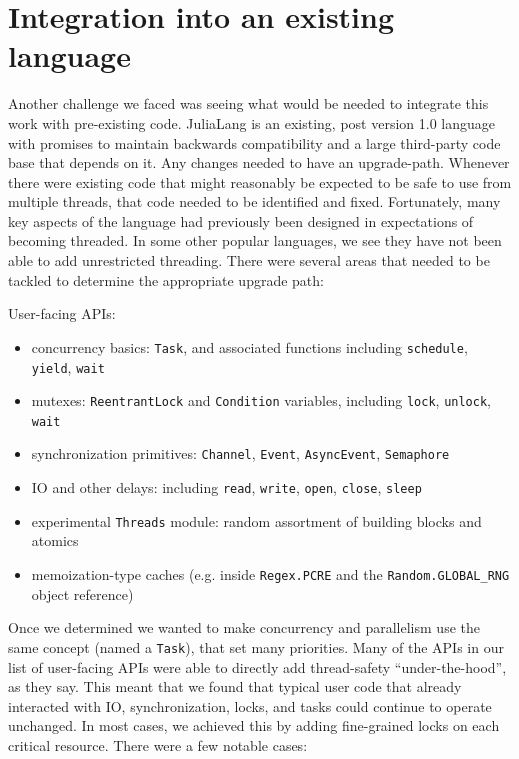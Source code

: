 \documentclass{juliacon}
\begin{document}
\section{Integration into an existing language}
\label{subsub:integration}

Another challenge we faced was seeing what would be needed to integrate this work with pre-existing code. JuliaLang is an existing, post version 1.0 language with promises to maintain backwards compatibility and a large third-party code base that depends on it. Any changes needed to have an upgrade-path. Whenever there were existing code that might reasonably be expected to be safe to use from multiple threads, that code needed to be identified and fixed. Fortunately, many key aspects of the language had previously been designed in expectations of becoming threaded. In some other popular languages, we see they have not been able to add unrestricted threading. There were several areas that needed to be tackled to determine the appropriate upgrade path:

User-facing APIs:
\begin{itemize}
\item concurrency basics: \verb|Task|, and associated functions including \verb|schedule|, \verb|yield|, \verb|wait|
\item mutexes: \verb|ReentrantLock| and \verb|Condition| variables, including \verb|lock|, \verb|unlock|, \verb|wait|
\item synchronization primitives: \verb|Channel|, \verb|Event|, \verb|AsyncEvent|, \verb|Semaphore|
\item IO and other delays: including \verb|read|, \verb|write|, \verb|open|, \verb|close|, \verb|sleep|
\item experimental \verb|Threads| module: random assortment of building blocks and atomics
\item memoization-type caches (e.g. inside \verb|Regex.PCRE| and the \verb|Random.GLOBAL_RNG| object reference)
\end{itemize}

Once we determined we wanted to make concurrency and parallelism use the same concept (named a \verb|Task|), that set many priorities. Many of the APIs in our list of user-facing APIs were able to directly add thread-safety ``under-the-hood'', as they say. This meant that we found that typical user code that already interacted with IO, synchronization, locks, and tasks could continue to operate unchanged. In most cases, we achieved this by adding fine-grained locks on each critical resource. There were a few notable cases:
\end{document}
